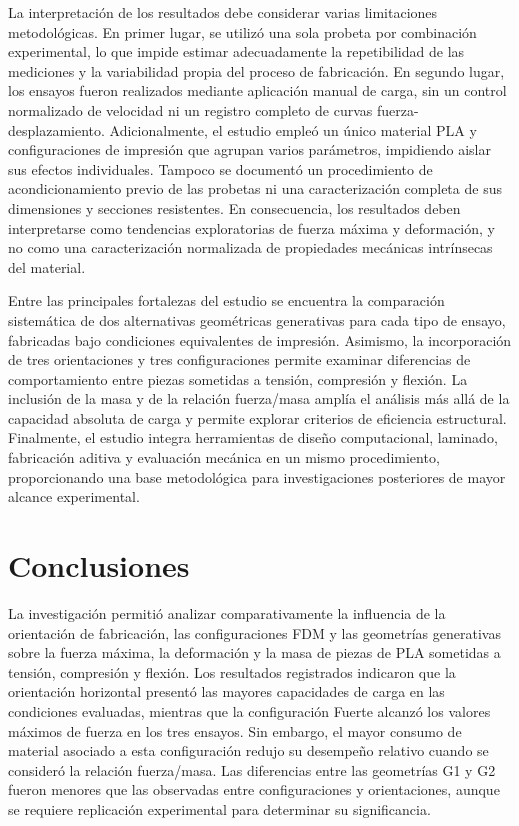 \documentclass[10pt,twocolumn]{article}
\begin{document}
La interpretación de los resultados debe considerar varias limitaciones metodológicas. En primer lugar, se utilizó una sola probeta por combinación experimental, lo que impide estimar adecuadamente la repetibilidad de las mediciones y la variabilidad propia del proceso de fabricación. En segundo lugar, los ensayos fueron realizados mediante aplicación manual de carga, sin un control normalizado de velocidad ni un registro completo de curvas fuerza-desplazamiento. Adicionalmente, el estudio empleó un único material PLA y configuraciones de impresión que agrupan varios parámetros, impidiendo aislar sus efectos individuales. Tampoco se documentó un procedimiento de acondicionamiento previo de las probetas ni una caracterización completa de sus dimensiones y secciones resistentes. En consecuencia, los resultados deben interpretarse como tendencias exploratorias de fuerza máxima y deformación, y no como una caracterización normalizada de propiedades mecánicas intrínsecas del material.

Entre las principales fortalezas del estudio se encuentra la comparación sistemática de dos alternativas geométricas generativas para cada tipo de ensayo, fabricadas bajo condiciones equivalentes de impresión. Asimismo, la incorporación de tres orientaciones y tres configuraciones permite examinar diferencias de comportamiento entre piezas sometidas a tensión, compresión y flexión. La inclusión de la masa y de la relación fuerza/masa amplía el análisis más allá de la capacidad absoluta de carga y permite explorar criterios de eficiencia estructural. Finalmente, el estudio integra herramientas de diseño computacional, laminado, fabricación aditiva y evaluación mecánica en un mismo procedimiento, proporcionando una base metodológica para investigaciones posteriores de mayor alcance experimental.
\section{Conclusiones}
La investigación permitió analizar comparativamente la influencia de la orientación de fabricación, las configuraciones FDM y las geometrías generativas sobre la fuerza máxima, la deformación y la masa de piezas de PLA sometidas a tensión, compresión y flexión. Los resultados registrados indicaron que la orientación horizontal presentó las mayores capacidades de carga en las condiciones evaluadas, mientras que la configuración Fuerte alcanzó los valores máximos de fuerza en los tres ensayos. Sin embargo, el mayor consumo de material asociado a esta configuración redujo su desempeño relativo cuando se consideró la relación fuerza/masa. Las diferencias entre las geometrías G1 y G2 fueron menores que las observadas entre configuraciones y orientaciones, aunque se requiere replicación experimental para determinar su significancia.
\end{document}

